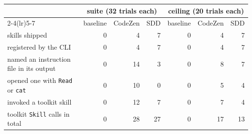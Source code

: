 
\begin{tabular}{@{}lrrrrrr@{}}
\toprule
 & \multicolumn{3}{c}{\textbf{suite} (32 trials each)} & \multicolumn{3}{c}{\textbf{ceiling} (20 trials each)} \\
\cmidrule(lr){2-4}\cmidrule(lr){5-7}
 & baseline & CodeZen & SDD & baseline & CodeZen & SDD \\
\midrule
skills shipped & 0 & 4 & 7 & 0 & 4 & 7 \\
registered by the CLI & 0 & 4 & 7 & 0 & 4 & 7 \\
named an instruction file in its output & 0 & 14 & 3 & 0 & 8 & 7 \\
opened one with \texttt{Read} or \texttt{cat} & 0 & 10 & 0 & 0 & 5 & 4 \\
invoked a toolkit skill & 0 & 12 & 7 & 0 & 7 & 4 \\
toolkit \texttt{Skill} calls in total & 0 & 28 & 27 & 0 & 17 & 13 \\
\bottomrule
\end{tabular}
